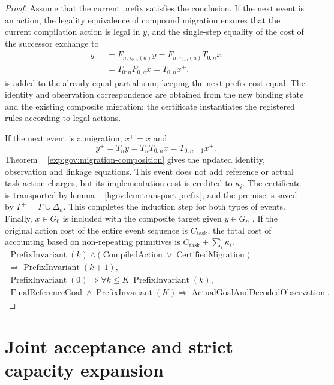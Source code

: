 \documentclass[12pt,a4paper,openany,notitlepage]{report}
\theoremstyle{plain}
\theoremstyle{definition}
\theoremstyle{remark}
\begin{document}
\begin{CJK*}
\begin{proof}
Assume that the current prefix satisfies the conclusion. If the next event is an action, the legality equivalence of compound migration ensures that the current compilation action is legal in $y$, and the single-step equality of the cost of the successor exchange to \[
\begin{aligned}
 y^+&=F_{n,\tau_{0:n}(a)}y
 =F_{n,\tau_{0:n}(a)}T_{0:n}x\\
 &=T_{0:n}F_{0,a}x=T_{0:n}x^+.
\end{aligned}
\] is added to the already equal partial sum, keeping the next prefix cost equal. The identity and observation correspondence are obtained from the new binding state and the existing composite migration; the certificate instantiates the registered rules according to legal actions.

If the next event is a migration, $x^+=x$ and \[
 y^+=T_ny=T_nT_{0:n}x=T_{0:n+1}x^+.
\] Theorem ~ \ref{exp:gov:migration-composition} gives the updated identity, observation and linkage equations. This event does not add reference or actual task action charges, but its implementation cost is credited to $\kappa_i$. The certificate is transported by lemma ~ \ref{hgov:lem:transport-prefix}, and the premise is saved by $\Gamma^+=\Gamma\cup\Delta_n$. This completes the induction step for both types of events. Finally, $x\in G_0$ is included with the composite target given $y\in G_n$ . If the original action cost of the entire event sequence is $C_{\mathrm{task}}$, the total cost of accounting based on non-repeating primitives is $C_{\mathrm{task}}+\sum_i\kappa_i$. \[
\begin{gathered}
 \operatorname{PrefixInvariant}(k)\land
 \bigl(\operatorname{CompiledAction}\lor\operatorname{CertifiedMigration}\bigr)\\
 \Rightarrow\operatorname{PrefixInvariant}(k+1),\\
 \operatorname{PrefixInvariant}(0)
 \Rightarrow\forall k\le K\ \operatorname{PrefixInvariant}(k),\\
 \operatorname{FinalReferenceGoal}\land\operatorname{PrefixInvariant}(K)
 \Rightarrow\operatorname{ActualGoalAndDecodedObservation}.
\end{gathered}
\]\end{proof}


\section { Joint acceptance and strict capacity expansion }\label{exp:gov:joint-section}



\end{CJK*}
\end{document}
